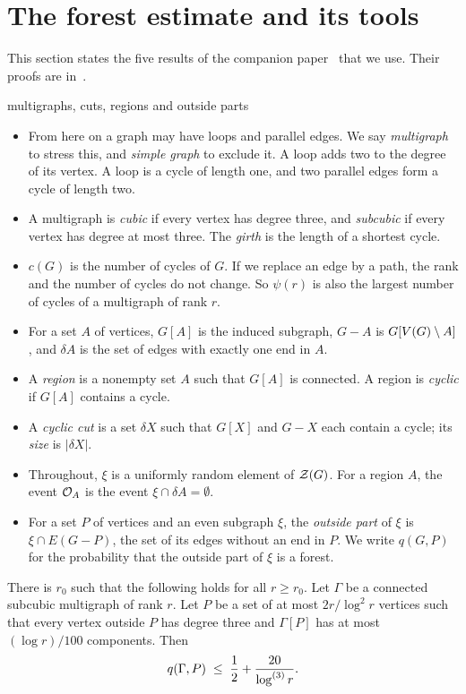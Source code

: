 \section{The forest estimate and its tools}\label{sec:tools}

This section states the five results of the companion paper~\cite{Forest} that we use. Their
proofs are in~\cite{Forest}.

\begin{notation}{multigraphs, cuts, regions and outside parts}
\begin{itemize}[leftmargin=1.2em]
\item From here on a graph may have loops and parallel edges. We say \emph{multigraph} to stress
this, and \emph{simple graph} to exclude it. A loop adds two to the degree of its vertex. A loop is
a cycle of length one, and two parallel edges form a cycle of length two.
\item A multigraph is \emph{cubic} if every vertex has degree three, and \emph{subcubic} if every
vertex has degree at most three. The \emph{girth} is the length of a shortest cycle.
\item $c(G)$ is the number of cycles of $G$. If we replace an edge by a path, the rank and the
number of cycles do not change. So
$\psi(r)$ is also the largest number of cycles of a multigraph of rank $r$.
\item For a set $A$ of vertices, $G[A]$ is the induced subgraph, $G-A$ is $G[V(G)\setminus A]$, and
$\delta A$ is the set of edges with exactly one end in $A$.
\item A \emph{region} is a nonempty set $A$ such that $G[A]$ is connected. A region is
\emph{cyclic} if $G[A]$ contains a cycle.
\item A \emph{cyclic cut} is a set $\delta X$ such that $G[X]$ and $G-X$ each contain a cycle; its
\emph{size} is $|\delta X|$.
\item Throughout, $\xi$ is a uniformly random element of $\mathcal{Z}(G)$. For a region $A$, the event
$\mathcal{O}_A$ is the event $\xi\cap\delta A=\emptyset$.
\item For a set $P$ of vertices and an even subgraph $\xi$, the \emph{outside part} of $\xi$ is
$\xi\cap E(G-P)$, the set of its edges without an end in $P$. We write $q(G,P)$ for the
probability that the outside part of $\xi$ is a forest.
\end{itemize}
\end{notation}

\begin{theorem}\label{thm:forest}
There is $r_0$ such that the following holds for all $r\ge r_0$. Let $\Gamma$ be a connected
subcubic multigraph of rank $r$. Let $P$ be a set of at most $2r/\log^{2}r$ vertices such that
every vertex outside $P$ has degree three and $\Gamma[P]$ has at most $(\log r)/100$ components.
Then
\[
  q(\Gamma,P)\;\le\;\frac12+\frac{20}{\log^{(3)}r}.
\]
\end{theorem}

